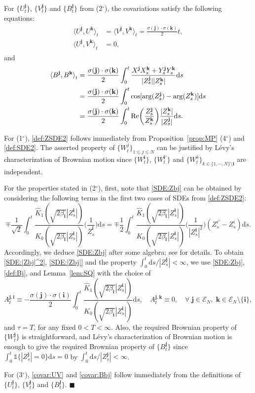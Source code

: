 \documentclass[12pt, twoside]{article}
\numberwithin{figure}{section}
\renewcommand{\Re}{{\rm Re}}
\newcommand{\1}{\mathds 1}
\newcommand{\la}{{\langle}}
\newcommand{\ra}{{\rangle}}
\newcommand{\mc}{\mathcal}
\renewcommand{\d}{{\mathrm d}}
\newcommand{\2}{{\mathbf 1}}
\renewenvironment{proof}[1][\proofname]{\noindent {\bfseries #1.}\;}{\hfill\ensuremath{\blacksquare}\\}
\newcommand{\cc}{{^\circ}}
\newcommand{\bi}{\mathbf i}
\newcommand{\bj}{\mathbf j}
\newcommand{\bk}{\mathbf k}
\newcommand{\hK}{{\widehat{K}}}
\newcommand{\two}{{\sqrt{2}}}
\begin{document}
\begin{thm}
\noindent {\rm (3$\cc$)} For $\{U_t^\bj\}$, $\{V_t^\bj\}$ and $\{B_t^\bj\}$ from {\rm (2$\cc$)}, the covariations satisfy the following equations: 
\begin{align}
\begin{split}
\label{covar:UV}
 \la U^\bj,U^\bk\ra_t&=\la V^\bj,V^\bk\ra_t=\frac{\sigma(\bj)\cdot \sigma(\bk)}{2}t,\\
  \la U^\bj,V^\bk\ra_t&= 0,
  \end{split}
\end{align}
and  
  \begin{align}
 \begin{split}
\la B^\bj,B^\bk\ra_t&=\frac{\sigma(\bj)\cdot \sigma(\bk)}{2}\int_0^t \frac{X^\bj X^\bk_s+Y^\bj_sY^\bk_s}{|Z^\bj_s||Z^\bk_s|}\d s\\
&=\frac{\sigma(\bj)\cdot \sigma(\bk)}{2}\int_0^t \cos [\arg(Z^\bj_s)-\arg(Z^\bk_s)]\d s\\
&=\frac{\sigma(\bj)\cdot \sigma(\bk)}{2}\int_0^t \Re\biggl(\frac{Z^\bj_s}{Z^\bk_s}\biggr)\frac{|Z^\bk_s|}{|Z^\bj_s|}\d s.
\label{covar:Bbj}
\end{split}
\end{align}
\end{thm}
\begin{proof}
For (1$\cc$), \eqref{def:ZSDE2} follows immediately from Proposition~\ref{prop:MP} (4$\cc$) and \eqref{def:SDE2}. 
 The asserted property of $\{W^j_t\}_{1\leq j\leq N}$ can be justified by
 L\'evy's characterization of Brownian motion \cite[3.16 Theorem, p.157]{KS:BM} since $\{W^\bi_t\}$, $\{W^{\bi\prime}_t\}$ and $ \{W^k_t\}_{k\in \{1,\cdots,N\}\setminus\bi}$ are independent.  

For the properties stated in (2$\cc$), first, note that \eqref{SDE:Zbj} can be obtained by considering the following terms in the first two cases of SDEs from \eqref{def:ZSDE2}:
\[
\mp\frac{1}{\two} \int_0^t \frac{\hK_1(\sqrt{2\beta_\bi}|Z^\bi_s|)}{ K_0(\sqrt{2\beta_\bi}|Z^\bi_s|)}\biggl(\frac{1}{ \overline{Z}^\bi_s}\biggr)\d s=\mp \frac{1}{2}\int_0^t \frac{\hK_1(\sqrt{2\beta_\bi}|Z^\bi_s|)}{ K_0(\sqrt{2\beta_\bi}|Z^\bi_s|)}\biggl(\frac{1}{|Z^{\bi}_s|^2}\biggr)(Z^{i\prime}_s-Z^i_s)\d s.
\]
Accordingly, we deduce \eqref{SDE:Zbj} after some algebra; see \cite[Proposition~2.2]{C:SDBG4} for details. To obtain \eqref{SDE:|Zbj|^2}, \eqref{SDE:|Zbj|} and the property $\int_0^t \d s/|Z^\bj_s|<\infty$, we use \eqref{SDE:Zbj}, \eqref{def:Bj}, and Lemma~\ref{lem:SQ} with the choice of
 \[
 A^{\bj,\bi}_t\equiv -\frac{\sigma(\bj)\cdot \sigma(\bi)}{2}\int_0^t  \frac{\hK_1(\sqrt{2\beta_\bi}|Z^\bi_s|)}{ K_0(\sqrt{2\beta_\bi}|Z^\bi_s|)}\d s,\quad  A^{\bj,\bk}_t\equiv 0,\quad \forall\;\bj\in \mc E_N,\;\bk\in \mc E_N\setminus\{\bi\}, 
 \]
 and $\tau=T$, for any fixed $0<T<\infty$. 
Also, the required Brownian property of $\{W^\bj_t\}$ is straightforward, and  
 L\'evy's characterization of Brownian motion is enough to give the required Brownian property of $\{B^\bj_t\}$ since $\int_0^t \1\{|Z^\bj_s|=0\}\d s=0$ by $\int_0^t \d s/|Z^\bj_s|<\infty$. 

For (3$\cc$), \eqref{covar:UV} and \eqref{covar:Bbj} follow immediately from the definitions of $\{U_t^\bj\}$, $\{V_t^\bj\}$ and $\{B_t^\bj\}$.
\end{proof}
\end{document}
